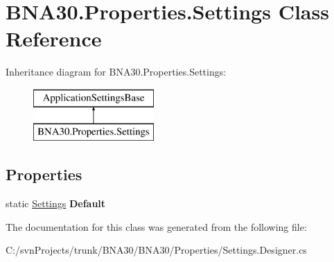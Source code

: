 \hypertarget{class_b_n_a30_1_1_properties_1_1_settings}{}\section{B\+N\+A30.\+Properties.\+Settings Class Reference}
\label{class_b_n_a30_1_1_properties_1_1_settings}
Inheritance diagram for B\+N\+A30.\+Properties.\+Settings\+:\begin{figure}[H]
\begin{center}
\leavevmode
\includegraphics[height=2.000000cm]{class_b_n_a30_1_1_properties_1_1_settings}
\end{center}
\end{figure}
\subsection*{Properties}
\begin{DoxyCompactItemize}
\item 
\mbox{\label{class_b_n_a30_1_1_properties_1_1_settings_a4fe3f83b377ddaa5d581c27a1476360c}} 
static \mbox{\hyperlink{class_b_n_a30_1_1_properties_1_1_settings}{Settings}} {\bfseries Default}
\end{DoxyCompactItemize}


The documentation for this class was generated from the following file\+:\begin{DoxyCompactItemize}
\item 
C\+:/svn\+Projects/trunk/\+B\+N\+A30/\+B\+N\+A30/\+Properties/Settings.\+Designer.\+cs\end{DoxyCompactItemize}
